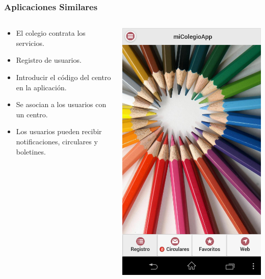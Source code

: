 
\begin{frame}
	\frametitle{Aplicaciones Similares}
	\begin{columns}
		\begin{column}{0.6\textwidth}
			\begin{itemize}
				\item El colegio contrata los servicios.
				\item Registro de usuarios.
				\item Introducir el código del centro en la aplicación.
				\item Se asocian a los usuarios con un centro.
				\item Los usuarios pueden recibir notificaciones, circulares y boletines.
			\end{itemize}
			\endblock{}
		\end{column}
		\begin{column}{0.4\textwidth}
			\hfill \includegraphics[width=0.7\linewidth]{Images/miColegioApp.png}
		\end{column}
	\end{columns}
\end{frame}

